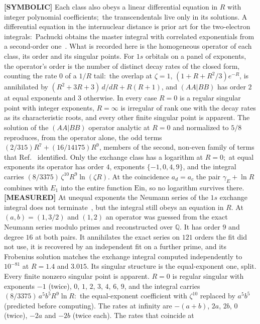 \documentclass[aps,pra,twocolumn,superscriptaddress,longbibliography]{revtex4-2}
\begin{document}
\textbf{[SYMBOLIC]} Each class also obeys a linear differential equation in $R$
with integer polynomial coefficients;\ the transcendentals live only in its
solutions.  A differential equation in the internuclear distance is prior
art for the two-electron integrals:\ Pachucki obtains the master integral
with correlated exponentials from a second-order one~\cite{pachucki2009}.
What is recorded here is the homogeneous operator of each class, its order
and its singular points.  For $1s$ orbitals on a panel of exponents, the operator's order is
the number of distinct decay rates of the closed form, counting the rate $0$ of
a $1/R$ tail:\ the overlap at $\zeta=1$, $(1+R+R^2/3)e^{-R}$, is annihilated by
$(R^2+3R+3)\,d/dR+R(R+1)$, and $(AA|BB)$ has order $2$ at equal exponents and
$3$ otherwise.  In every case $R=0$ is a regular singular point with integer
exponents, $R=\infty$ is irregular of rank one with the decay rates as its
characteristic roots, and every other finite singular point is apparent.  The
solution of the $(AA|BB)$ operator analytic at $R=0$ and normalized to $5/8$
reproduces, from the operator alone, the odd terms $(2/315)R^7+(16/14175)R^9$, members of the second, non-even
family of terms that Ref.~\cite{silverstone1967} identified.  Only the exchange class has a
logarithm at $R=0$;\ at equal exponents its operator has order $4$, exponents $\{-1,0,4,9\}$, and
the integral carries $(8/3375)\,\zeta^{10}R^9\ln(\zeta R)$.  At the coincidence $a_d=a_c$ the pair $\gamma_E+\ln R$ combines with $E_1$ into the entire
function $\mathrm{Ein}$, so no logarithm survives there.
\textbf{[MEASURED]} At unequal exponents the Neumann series of the $1s$ exchange integral does not
terminate~\cite{lesiuk2014b}, but the integral still obeys an equation in $R$.  At $(a,b)=(1,3/2)$ and $(1,2)$ an operator was guessed from
the exact Neumann series modulo primes and reconstructed over $\mathbb{Q}$.  It has order $9$
and degree $16$ at both pairs.  It annihilates the exact series on $121$ orders the fit did not
use, it is recovered by an independent fit on a further prime, and its Frobenius solution
matches the exchange integral computed independently to $10^{-81}$ at $R=1.4$ and $3.015$.  Its
singular structure is the equal-exponent one, split.  Every finite nonzero singular point is
apparent.  $R=0$ is regular singular with exponents $-1$ (twice), $0$, $1$, $2$, $3$, $4$, $6$, $9$, and
the integral carries $(8/3375)\,a^5b^5R^9\ln R$:\ the equal-exponent coefficient with
$\zeta^{10}$ replaced by $a^5b^5$ (predicted before computing).  The rates at infinity are
$-(a+b)$, $2a$, $2b$, $0$ (twice), $-2a$ and $-2b$ (twice each).  The rates that coincide at
\end{document}
